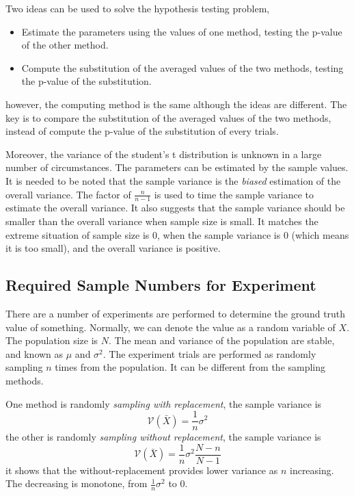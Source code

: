 Two ideas can be used to solve the hypothesis testing problem,
\begin{itemize}
    \item Estimate the parameters using the values of one method, testing the p-value of the other method.
    \item Compute the substitution of the averaged values of the two methods, testing the p-value of the substitution.
\end{itemize}
however, the computing method is the same although the ideas are different.
The key is to compare the substitution of the averaged values of the two methods,
instead of compute the p-value of the substitution of every trials.

Moreover, the variance of the student's t distribution is unknown in a large number of circumstances.
The parameters can be estimated by the sample values.
It is needed to be noted that the sample variance is the \emph{biased} estimation of the overall variance.
The factor of $\frac{n}{n-1}$ is used to time the sample variance to estimate the overall variance.
It also suggests that the sample variance should be smaller than the overall variance when sample size is small.
It matches the extreme situation of sample size is $0$,
when the sample variance is $0$ (which means it is too small), and the overall variance is positive.

\subsection{Required Sample Numbers for Experiment}

There are a number of experiments are performed to determine the ground truth value of something.
Normally, we can denote the value as a random variable of $X$.
The population size is $N$.
The mean and variance of the population are stable, and known as $\mu$ and $\sigma^2$.
The experiment trials are performed as randomly sampling $n$ times from the population.
It can be different from the sampling methods.

One method is randomly \emph{sampling with replacement},
the sample variance is
\begin{equation}
    \label{Equation: Variance of Sample Variance on With-Replacement Sampling}
    \mathcal{V}(\bar{X}) = \frac{1}{n} \sigma^2
\end{equation}
the other is randomly \emph{sampling without replacement},
the sample variance is
\begin{equation}
    \label{Equation: Variance of Sample Variance on Without-Replacement Sampling}
    \mathcal{V}(\bar{X})  = \frac{1}{n} \sigma^2 \frac{N-n}{N-1}
\end{equation}
it shows that the without-replacement provides lower variance as $n$ increasing.
The decreasing is monotone, from $\frac{1}{n} \sigma^2$ to $0$.

